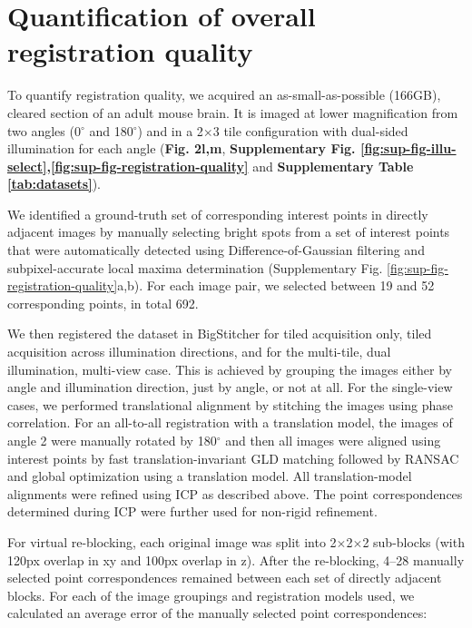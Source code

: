 \section{Quantification of overall registration quality}
\label{sec:quantReg}

To quantify registration quality, we acquired an as-small-as-possible (166GB), cleared section of an adult mouse brain. It is imaged at lower magnification from two angles (0${}^\circ$ and 180${}^\circ$) and in a 2$\times$3 tile configuration with dual-sided illumination for each angle (\textbf{Fig. 2l,m}, \textbf{Supplementary Fig. \ref{fig:sup-fig-illu-select},\ref{fig:sup-fig-registration-quality}} and \textbf{Supplementary Table \ref{tab:datasets}}).

We identified a ground-truth set of corresponding interest points in directly adjacent images by manually selecting bright spots from a set of interest points that were automatically detected using Difference-of-Gaussian filtering and subpixel-accurate local maxima determination (Supplementary Fig. \ref{fig:sup-fig-registration-quality}a,b). For each image pair, we selected between 19 and 52 corresponding points, in total 692.

We then registered the dataset in BigStitcher for tiled acquisition only, tiled acquisition across illumination directions, and for the multi-tile, dual illumination, multi-view case. This is achieved by grouping the images either by angle and illumination direction, just by angle, or not at all. 
For the single-view cases, we performed translational alignment by stitching the images using phase correlation. For an all-to-all registration with a translation model, the images of angle 2 were manually rotated by 180${}^\circ$ and then all images were aligned using interest points by fast translation-invariant GLD matching followed by RANSAC\cite{ransac} and global optimization using a translation model. All translation-model alignments were refined using ICP\cite{icp} as described above. The point correspondences determined during ICP were further used for non-rigid refinement.

For virtual re-blocking, each original image was split into 2$\times$2$\times$2 sub-blocks (with 120px overlap in xy and 100px overlap in z). After the re-blocking, 4--28 manually selected point correspondences remained between each set of directly adjacent blocks. For each of the image groupings and registration models used, we calculated an average error of the manually selected point correspondences:

